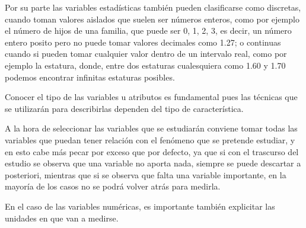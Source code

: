 \begin{frame}
{Por su parte las variables estadísticas también pueden clasificarse como discretas, cuando toman valores aislados que
suelen ser números enteros, como por ejemplo el número de hijos de una familia, que puede ser 0, 1, 2, 3, es decir, un
número entero posito pero no puede tomar valores decimales como 1.27; o continuas cuando si pueden tomar cualquier
valor dentro de un intervalo real, como por ejemplo la estatura, donde, entre dos estaturas cualesquiera como 1.60 y
1.70 podemos encontrar infinitas estaturas posibles.

Conocer el tipo de las variables u atributos es fundamental pues las técnicas que se utilizarán
para describirlas dependen del tipo de característica.

A la hora de seleccionar las variables que se estudiarán conviene tomar todas las variables que puedan tener relación
con el fenómeno que se pretende estudiar, y en esto cabe más pecar por exceso que por defecto, ya que si con el
trascurso del estudio se observa que una variable no aporta nada, siempre se puede descartar a posteriori, mientras que
si se observa que falta una variable importante, en la mayoría de los casos no se podrá volver atrás para
medirla.

En el caso de las variables numéricas, es importante también explicitar las unidades en que van a medirse. 
}
\end{frame}


